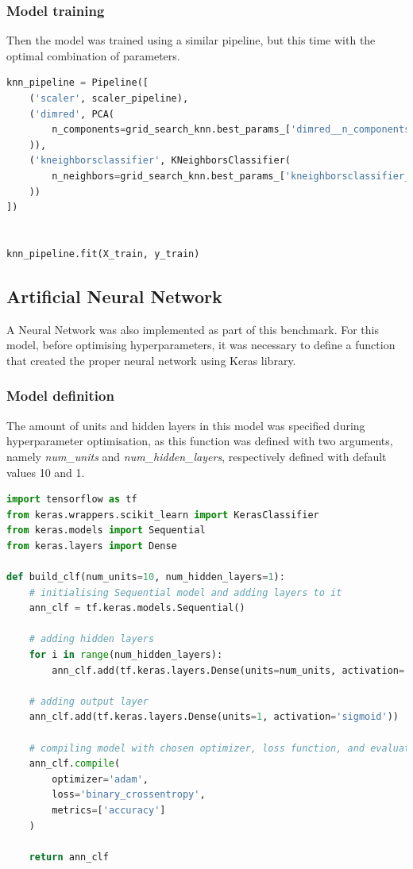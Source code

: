 \documentclass{article}
\begin{document}
\subsubsection{Model training}
Then the model was trained using a similar pipeline, but this time with the optimal combination of parameters.

\begin{lstlisting}[language=Python]
knn_pipeline = Pipeline([
    ('scaler', scaler_pipeline), 
    ('dimred', PCA(
        n_components=grid_search_knn.best_params_['dimred__n_components']
    )),
    ('kneighborsclassifier', KNeighborsClassifier(
        n_neighbors=grid_search_knn.best_params_['kneighborsclassifier__n_neighbors']
    ))
])


knn_pipeline.fit(X_train, y_train)
\end{lstlisting}

\subsection{Artificial Neural Network}

A Neural Network was also implemented as part of this benchmark. For this model, before optimising hyperparameters, it was necessary to define a function that created the proper neural network using Keras library. 

\subsubsection{Model definition}
The amount of units and hidden layers in this model was specified during hyperparameter optimisation, as this function was defined with two arguments, namely \emph{num\_units} and \emph{num\_hidden\_layers}, respectively defined with default values 10 and 1.

\begin{lstlisting}[language=Python]
import tensorflow as tf
from keras.wrappers.scikit_learn import KerasClassifier
from keras.models import Sequential
from keras.layers import Dense

def build_clf(num_units=10, num_hidden_layers=1):
    # initialising Sequential model and adding layers to it
    ann_clf = tf.keras.models.Sequential()
    
    # adding hidden layers
    for i in range(num_hidden_layers):
        ann_clf.add(tf.keras.layers.Dense(units=num_units, activation='relu'))

    # adding output layer
    ann_clf.add(tf.keras.layers.Dense(units=1, activation='sigmoid'))
    
    # compiling model with chosen optimizer, loss function, and evaluation metrics
    ann_clf.compile(
        optimizer='adam',
        loss='binary_crossentropy',
        metrics=['accuracy']
    )
    
    return ann_clf
\end{lstlisting}
\end{document}
